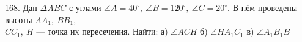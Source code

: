 168. Дан $\Delta ABC$ с углами $\angle A=40^\circ,\ \angle B=120^\circ,\ \angle C=20^\circ.$ В нём проведены высоты $AA_1,\ BB_1,$\\$ CC_1,\ H$ --- точка их пересечения. Найти: а) $\angle ACH$ б) $\angle HA_1C_1$ в) $\angle A_1B_1B$\\
